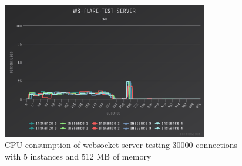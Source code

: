 \begin{figure}[H]
  \centering
    \includegraphics[width=0.8\textwidth]{figures/experiments/experiment-1/node-js/cpu-30000-5-instances-512-memory.png}
    \caption{CPU consumption of websocket server testing 30000 connections with 5 instances and 512 MB of memory}
    \label{fig:experiment-3-cpu-530000000-5-instances-512-mem}
\end{figure}